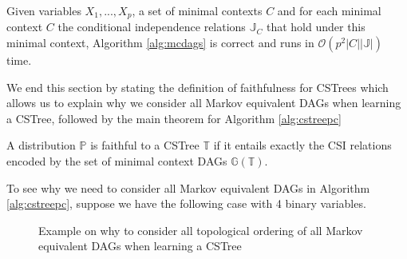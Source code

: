 \documentclass{tufte-book}
\begin{document}
\begin{theorem}\label{thm:mcdagscorrectness}
Given variables $X_1,...,X_p$, a set of minimal contexts $C$ and for each minimal context $C$ the conditional independence relations $\mathbb{J}_C$ that hold under this minimal context, Algorithm \ref{alg:mcdags} is correct and runs in $\mathcal{O}(p^2 |C||\mathbb{J}|)$ time.
\end{theorem}





We end this section by stating the definition of faithfulness for CSTrees which allows us to explain why we consider all Markov equivalent DAGs when learning a CSTree, followed by the main theorem for Algorithm \ref{alg:cstreepc}

\begin{definition}\label{def:faithfulnesscstrees}
A distribution $\mathbb{P}$ is faithful to a CSTree $\mathbb{T}$ if it entails exactly the CSI relations encoded by the set of minimal context DAGs $\mathbb{G}(\mathbb{T})$.
\end{definition}

To see why we need to consider all Markov equivalent DAGs in Algorithm \ref{alg:cstreepc}, suppose we have the following case with 4 binary variables.


\begin{figure}[!h]\label{fig:dagtocstree_cstree}
   \begin{floatrow}
%
\caption{Example on why to consider all topological ordering of all Markov equivalent DAGs when learning a CSTree}
        
   \end{floatrow}
\end{figure}
\end{document}
